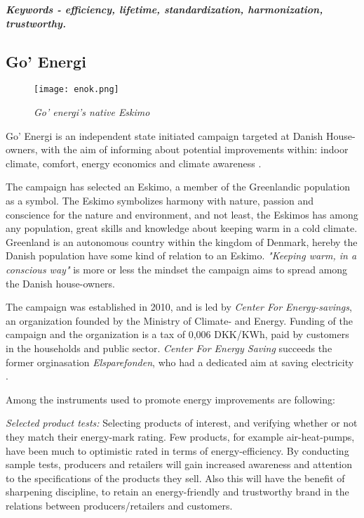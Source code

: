\documentclass[journal]{IEEEtran}
\begin{document}
\textbf{\textit{Keywords - efficiency, lifetime, standardization, harmonization, trustworthy.}}

\subsection{Go' Energi}
\begin{figure}
\texttt{[image: enok.png]}
\caption{\textit{Go' energi's native Eskimo}}			
\label{fig:enok} %
\end{figure}

Go' Energi is an independent state initiated campaign targeted at Danish House-owners, with the aim of informing about potential improvements within: indoor climate, comfort, energy economics and climate awareness \cite{goenergi}.

The campaign has selected an Eskimo, a member of the Greenlandic population as a symbol. The Eskimo symbolizes harmony with nature, passion and conscience for the nature and environment, and not least, the Eskimos has among any population, great skills and knowledge about keeping warm in a cold climate. Greenland 
is an autonomous country within the kingdom of Denmark, hereby the Danish population have some kind of relation to an Eskimo.  
\textit{"Keeping warm, in a conscious way"} is more or less the mindset the campaign aims to spread among the Danish house-owners. 

The campaign was established in 2010, and is led by \textit{Center For Energy-savings}, an organization founded by the Ministry of Climate- and Energy. Funding of the campaign and the organization is a tax of 0,006 DKK/KWh, paid by customers in the households and public sector. \textit{Center For Energy Saving} succeeds the former orginasation \textit{Elsparefonden}, who had a dedicated aim at saving electricity \cite{annual_ens_10}. 

Among the instruments used to promote energy improvements are following:

\textit{Selected product tests:} Selecting products of interest, and verifying whether or not they match their energy-mark rating. Few products, for example air-heat-pumps, have been much to optimistic rated in terms of energy-efficiency. By conducting sample tests, producers and retailers will gain increased awareness and attention to the specifications of the products they sell. Also this will have the benefit of sharpening discipline, to retain an energy-friendly and trustworthy brand in the relations between producers/retailers and customers.
\end{document}
